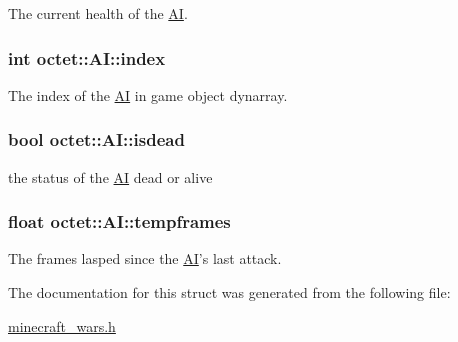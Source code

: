 The current health of the \hyperlink{structoctet_1_1_a_i}{A\+I}. 

\hypertarget{structoctet_1_1_a_i_a661a3cbb84347cd57da5a2f45ec2fbdc}{
\subsubsection[{index}]{\setlength{\rightskip}{0pt plus 5cm}int octet\+::\+A\+I\+::index}}\label{structoctet_1_1_a_i_a661a3cbb84347cd57da5a2f45ec2fbdc}


The index of the \hyperlink{structoctet_1_1_a_i}{A\+I} in game object dynarray. 

\hypertarget{structoctet_1_1_a_i_a2938e1f9b22f03013d677b42149d5d96}{
\subsubsection[{isdead}]{\setlength{\rightskip}{0pt plus 5cm}bool octet\+::\+A\+I\+::isdead}}\label{structoctet_1_1_a_i_a2938e1f9b22f03013d677b42149d5d96}


the status of the \hyperlink{structoctet_1_1_a_i}{A\+I} dead or alive 

\hypertarget{structoctet_1_1_a_i_a9628b67694f7928830f82bac2360b2b7}{
\subsubsection[{tempframes}]{\setlength{\rightskip}{0pt plus 5cm}float octet\+::\+A\+I\+::tempframes}}\label{structoctet_1_1_a_i_a9628b67694f7928830f82bac2360b2b7}


The frames lasped since the \hyperlink{structoctet_1_1_a_i}{A\+I}'s last attack. 



The documentation for this struct was generated from the following file\+:\begin{DoxyCompactItemize}
\item 
\hyperlink{minecraft__wars_8h}{minecraft\+\_\+wars.\+h}\end{DoxyCompactItemize}
